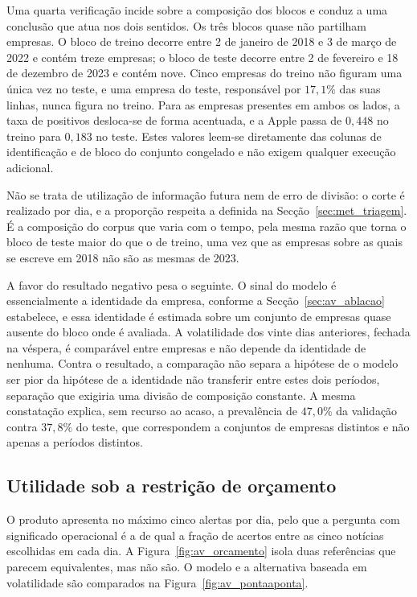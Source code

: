 Uma quarta verificação incide sobre a composição dos blocos e conduz a uma conclusão que atua nos
dois sentidos. Os três blocos quase não partilham empresas. O bloco de treino decorre entre 2 de
janeiro de 2018 e 3 de março de 2022 e contém treze empresas; o bloco de teste decorre entre 2 de
fevereiro e 18 de dezembro de 2023 e contém nove. Cinco empresas do treino não figuram uma única vez
no teste, e uma empresa do teste, responsável por $17{,}1\%$ das suas linhas, nunca figura no treino.
Para as empresas presentes em ambos os lados, a taxa de positivos desloca-se de forma acentuada, e a
Apple passa de $0{,}448$ no treino para $0{,}183$ no teste. Estes valores leem-se diretamente das
colunas de identificação e de bloco do conjunto congelado e não exigem qualquer execução adicional.

Não se trata de utilização de informação futura nem de erro de divisão: o corte é realizado por dia,
e a proporção respeita a definida na Secção~\ref{sec:met_triagem}. É a composição do corpus que varia
com o tempo, pela mesma razão que torna o bloco de teste maior do que o de treino, uma vez que as
empresas sobre as quais se escreve em 2018 não são as mesmas de 2023.

A favor do resultado negativo pesa o seguinte. O sinal do modelo é essencialmente a identidade da
empresa, conforme a Secção~\ref{sec:av_ablacao} estabelece, e essa identidade é estimada sobre um
conjunto de empresas quase ausente do bloco onde é avaliada. A volatilidade dos vinte dias
anteriores, fechada na véspera, é comparável entre empresas e não depende da identidade de
nenhuma. Contra o
resultado, a comparação não separa a hipótese de o modelo ser pior da hipótese de a identidade não
transferir entre estes dois períodos, separação que exigiria uma divisão de composição constante. A
mesma constatação explica, sem recurso ao acaso, a prevalência de $47{,}0\%$ da validação contra
$37{,}8\%$ do teste, que correspondem a conjuntos de empresas distintos e não apenas a períodos
distintos.

\subsection{Utilidade sob a restrição de orçamento}

O produto apresenta no máximo cinco alertas por dia, pelo que a pergunta com significado operacional
é a de qual a fração de acertos entre as cinco notícias escolhidas em cada dia. A
Figura~\ref{fig:av_orcamento} isola duas referências que parecem equivalentes, mas não são.
O modelo e a alternativa baseada em volatilidade são comparados na
Figura~\ref{fig:av_pontaaponta}.

